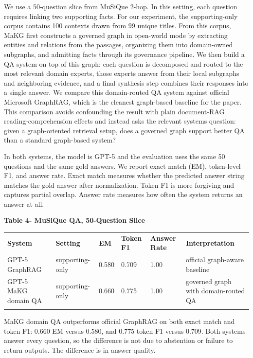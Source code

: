 We use a 50-question slice from MuSiQue 2-hop. In this setting, each
question requires linking two supporting facts. For our experiment, the
supporting-only corpus contains 100 contexts drawn from 99 unique
titles. From this corpus, MaKG first constructs a governed graph in
open-world mode by extracting entities and relations from the passages,
organizing them into domain-owned subgraphs, and admitting facts through
its governance pipeline. We then build a QA system on top of this graph:
each question is decomposed and routed to the most relevant domain
experts, those experts answer from their local subgraphs and neighboring
evidence, and a final synthesis step combines their responses into a
single answer. We compare this domain-routed QA system against official
Microsoft GraphRAG, which is the cleanest graph-based baseline for the
paper. This comparison avoids confounding the result with plain
document-RAG reading-comprehension effects and instead asks the relevant
systems question: given a graph-oriented retrieval setup, does a
governed graph support better QA than a standard graph-based system?

In both systems, the model is GPT-5 and the evaluation uses the same 50
questions and the same gold answers. We report exact match (EM),
token-level F1, and answer rate. Exact match measures whether the
predicted answer string matches the gold answer after normalization.
Token F1 is more forgiving and captures partial overlap. Answer rate
measures how often the system returns an answer at all.

\textbf{Table 4- MuSiQue QA, 50-Question Slice}

{\def\LTcaptype{none} %
\begin{longtable}[]{@{}llllll@{}}
\toprule\noalign{}
\textbf{System} & \textbf{Setting} & \textbf{EM} & \textbf{Token F1} &
\textbf{Answer Rate} & \textbf{Interpretation} \\
GPT-5 GraphRAG & supporting-only & 0.580 & 0.709 & 1.00 & official
graph-aware baseline \\
GPT-5 MaKG domain QA & supporting-only & 0.660 & 0.775 & 1.00 & governed
graph with domain-routed QA \\
\midrule\noalign{}
\endhead
\bottomrule\noalign{}
\endlastfoot
\end{longtable}
}

MaKG domain QA outperforms official GraphRAG on both exact match and
token F1: 0.660 EM versus 0.580, and 0.775 token F1 versus 0.709. Both
systems answer every question, so the difference is not due to
abstention or failure to return outputs. The difference is in answer
quality.

